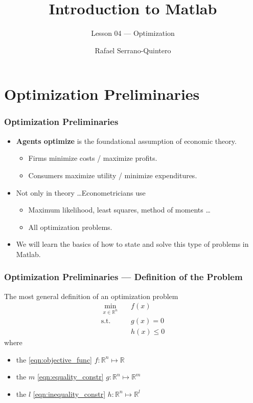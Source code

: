 \documentclass[11pt,xcolor={svgnames},aspectratio=169,usepdftitle=false,notheorems]{beamer}
\title{Introduction to Matlab}
\subtitle{Lesson 04 --- Optimization}
\author{Rafael Serrano-Quintero}
\institute{Department of Economics \\ University of Barcelona}
\date{}
\begin{document}
\VerbatimFootnotes

\maketitle

\section{Optimization Preliminaries}

\begin{frame}
  \frametitle{Optimization Preliminaries}
\begin{itemize}
  \item \alert{\textbf{Agents optimize}} is the foundational assumption of economic theory.
  \begin{itemize}
    \item Firms minimize costs / maximize profits.
    \item Consumers maximize utility / minimize expenditures.
  \end{itemize}
  \item Not only in theory \ldots Econometricians use
  \begin{itemize}
    \item Maximum likelihood, least squares, method of moments \ldots
    \item All optimization problems.
  \end{itemize}
  \item We will learn the basics of how to state and solve this type of problems in Matlab.
\end{itemize}
\end{frame}

\begin{frame}
  \frametitle{Optimization Preliminaries --- Definition of the Problem}
The most general definition of an optimization problem
\begin{align}
  \underset{x\in\mathbb{R}^n}{\min} \phantom{\Omega} &   f(x) \tag{Objective Function} \label{eqn:objective_func} \\
  \text{s.t. } & g(x) = 0 \tag{Equality Constraints} \label{eqn:equality_constr} \\
  \phantom{\text{s.t.}} & h(x) \leq 0 \tag{Inequality Constraints} \label{eqn:inequality_constr}
\end{align}
where
\begin{itemize}
  \item the \ref{eqn:objective_func} $f :\mathbb{R}^n\mapsto \mathbb{R}$
  \item the $m$ \ref{eqn:equality_constr} $g :\mathbb{R}^n\mapsto \mathbb{R}^m$
  \item the $l$ \ref{eqn:inequality_constr} $h :\mathbb{R}^n\mapsto \mathbb{R}^l$
\end{itemize}
\end{frame}
\end{document}
